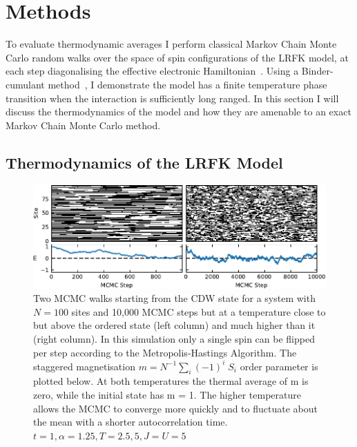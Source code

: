 \hypertarget{sec:lrfk-methods}{%
\section{Methods}\label{sec:lrfk-methods}}

To evaluate thermodynamic averages I perform classical Markov Chain Monte Carlo random walks over the space of spin configurations of the LRFK model, at each step diagonalising the effective electronic Hamiltonian~\autocite{maskaThermodynamicsTwodimensionalFalicovKimball2006}. Using a Binder-cumulant method~\autocite{binderFiniteSizeScaling1981,musialMonteCarloSimulations2002}, I demonstrate the model has a finite temperature phase transition when the interaction is sufficiently long ranged. In this section I will discuss the thermodynamics of the model and how they are amenable to an exact Markov Chain Monte Carlo method.

\hypertarget{thermodynamics-of-the-lrfk-model}{%
\subsection{Thermodynamics of the LRFK Model}\label{thermodynamics-of-the-lrfk-model}}

\hypertarget{fig:raw_steps_single_flip}{%
\begin{figure}
\centering
\includegraphics[width=1\textwidth,height=\textheight]{figure_code/fk_chapter/lsr/pdf_figs/raw_steps_single_flip}
\caption[{Comparison of different proposal distributions}]{Two MCMC walks starting from the CDW state for a system with \(N = 100\) sites and 10,000 MCMC steps but at a temperature close to but above the ordered state (left column) and much higher than it (right column). In this simulation only a single spin can be flipped per step according to the Metropolis-Hastings Algorithm. The staggered magnetisation \(m = N^{-1} \sum_i (-1)^i \; S_i\) order parameter is plotted below. At both temperatures the thermal average of m is zero, while the initial state has m = 1. The higher temperature allows the MCMC to converge more quickly and to fluctuate about the mean with a shorter autocorrelation time. \(t = 1, \alpha = 1.25, T = {2.5,5}, J = U = 5\)}
\label{fig:raw_steps_single_flip}
\end{figure}
}

